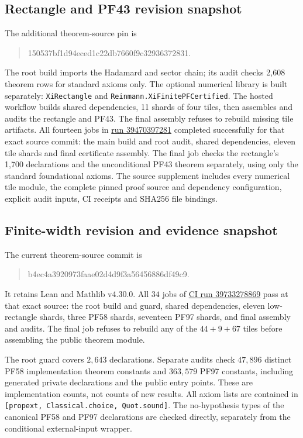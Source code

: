 \documentclass[11pt]{amsart}
\begin{document}
\subsection*{Rectangle and PF43 revision snapshot}
The additional theorem-source pin is
\begin{quote}\small\ttfamily
150537bf1d94eced1c22db7660f9c32936372831.
\end{quote}
The root build imports the Hadamard and sector chain; its audit checks
2,608 theorem rows for standard axioms only. The optional numerical library is
built separately: \texttt{XiRectangle} and
\texttt{Reinmann.XiFinitePFCertified}. The hosted workflow builds shared
dependencies, 11 shards of four tiles, then assembles and audits the rectangle
and PF43. The final assembly refuses to rebuild missing tile artifacts.
All fourteen jobs in
\href{https://github.com/sciencenerd-des/reinmann/actions/runs/39470397281}{run 39470397281}
completed successfully for that exact source commit: the main build and root
audit, shared dependencies, eleven tile shards and final certificate assembly.
The final job checks the rectangle's 1,700 declarations and the unconditional
PF43 theorem separately, using only the standard foundational axioms.
The source supplement includes every numerical tile module, the complete
pinned proof source and dependency configuration, explicit audit inputs,
CI receipts and SHA256 file bindings.

\subsection*{Finite-width revision and evidence snapshot}
The current theorem-source commit is
\begin{quote}\small\ttfamily
b4ec4a3920973faae02d4d9f3a56456886df49c9.
\end{quote}
It retains Lean and Mathlib v4.30.0. All $34$ jobs of
\href{https://github.com/sciencenerd-des/reinmann/actions/runs/39733278869}{CI run 39733278869}
pass at that exact source: the root build and guard, shared dependencies,
eleven low-rectangle shards, three PF58 shards, seventeen PF97 shards, and
final assembly and audits. The final job refuses to rebuild any of the
$44+9+67$ tiles before assembling the public theorem module.

The root guard covers $2{,}643$ declarations. Separate audits check
$47{,}896$ distinct PF58 implementation theorem constants and $363{,}579$
PF97 constants, including generated private declarations and the public
entry points. These are implementation counts, not counts of new results.
All axiom lists are contained in \texttt{[propext, Classical.choice, Quot.sound]}.
The no-hypothesis types of the canonical PF58 and PF97 declarations are
checked directly, separately from the conditional external-input wrapper.
\end{document}
